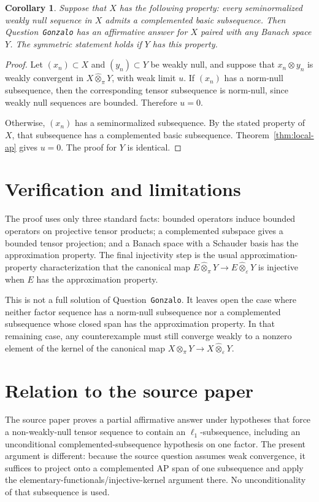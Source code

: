 \documentclass[11pt]{article}
\newtheorem{corollary}{Corollary}
\newcommand{\pten}{\widehat{\otimes}_{\pi}}
\newcommand{\eten}{\widehat{\otimes}_{\varepsilon}}
\begin{document}
\begin{corollary}\label{cor:cbsp}
Suppose that \(X\) has the following property: every seminormalized weakly null sequence in \(X\) admits a complemented basic subsequence.  Then Question~\texttt{Gonzalo} has an affirmative answer for \(X\) paired with any Banach space \(Y\).  The symmetric statement holds if \(Y\) has this property.
\end{corollary}

\begin{proof}
Let \((x_n)\subset X\) and \((y_n)\subset Y\) be weakly null, and suppose that \(x_n\otimes y_n\) is weakly convergent in \(X\pten Y\), with weak limit \(u\).  If \((x_n)\) has a norm-null subsequence, then the corresponding tensor subsequence is norm-null, since weakly null sequences are bounded.  Therefore \(u=0\).

Otherwise, \((x_n)\) has a seminormalized subsequence.  By the stated property of \(X\), that subsequence has a complemented basic subsequence.  Theorem~\ref{thm:local-ap} gives \(u=0\).  The proof for \(Y\) is identical.
\end{proof}

\section*{Verification and limitations}

The proof uses only three standard facts: bounded operators induce bounded operators on projective tensor products; a complemented subspace gives a bounded tensor projection; and a Banach space with a Schauder basis has the approximation property.  The final injectivity step is the usual approximation-property characterization that the canonical map \(E\pten Y\to E\eten Y\) is injective when \(E\) has the approximation property.

This is not a full solution of Question~\texttt{Gonzalo}.  It leaves open the case where neither factor sequence has a norm-null subsequence nor a complemented subsequence whose closed span has the approximation property.  In that remaining case, any counterexample must still converge weakly to a nonzero element of the kernel of the canonical map \(X\pten Y\to X\eten Y\).

\section*{Relation to the source paper}

The source paper proves a partial affirmative answer under hypotheses that force a non-weakly-null tensor sequence to contain an \(\ell_1\)-subsequence, including an unconditional complemented-subsequence hypothesis on one factor.  The present argument is different: because the source question assumes weak convergence, it suffices to project onto a complemented AP span of one subsequence and apply the elementary-functionals/injective-kernel argument there.  No unconditionality of that subsequence is used.
\end{document}
